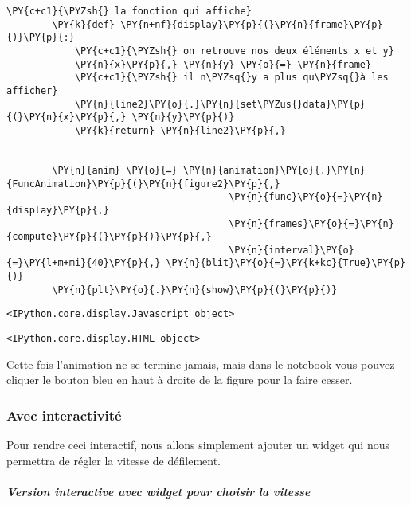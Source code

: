 \begin{Verbatim}[commandchars=\\\{\},frame=single,framerule=0.3mm,rulecolor=\color{cellframecolor}]
        \PY{c+c1}{\PYZsh{} la fonction qui affiche}
        \PY{k}{def} \PY{n+nf}{display}\PY{p}{(}\PY{n}{frame}\PY{p}{)}\PY{p}{:}
            \PY{c+c1}{\PYZsh{} on retrouve nos deux éléments x et y}
            \PY{n}{x}\PY{p}{,} \PY{n}{y} \PY{o}{=} \PY{n}{frame}
            \PY{c+c1}{\PYZsh{} il n\PYZsq{}y a plus qu\PYZsq{}à les afficher}
            \PY{n}{line2}\PY{o}{.}\PY{n}{set\PYZus{}data}\PY{p}{(}\PY{n}{x}\PY{p}{,} \PY{n}{y}\PY{p}{)}
            \PY{k}{return} \PY{n}{line2}\PY{p}{,}
        
        
        \PY{n}{anim} \PY{o}{=} \PY{n}{animation}\PY{o}{.}\PY{n}{FuncAnimation}\PY{p}{(}\PY{n}{figure2}\PY{p}{,}
                                       \PY{n}{func}\PY{o}{=}\PY{n}{display}\PY{p}{,}
                                       \PY{n}{frames}\PY{o}{=}\PY{n}{compute}\PY{p}{(}\PY{p}{)}\PY{p}{,}
                                       \PY{n}{interval}\PY{o}{=}\PY{l+m+mi}{40}\PY{p}{,} \PY{n}{blit}\PY{o}{=}\PY{k+kc}{True}\PY{p}{)}
        \PY{n}{plt}\PY{o}{.}\PY{n}{show}\PY{p}{(}\PY{p}{)}
\end{Verbatim}


    
    \begin{verbatim}
<IPython.core.display.Javascript object>
    \end{verbatim}

    
    
    \begin{verbatim}
<IPython.core.display.HTML object>
    \end{verbatim}

    
    Cette fois l'animation ne se termine jamais, mais dans le notebook vous
pouvez cliquer le bouton bleu en haut à droite de la figure pour la
faire cesser.

    \hypertarget{avec-interactivituxe9}{%
\subsubsection{Avec interactivité}\label{avec-interactivituxe9}}

    Pour rendre ceci interactif, nous allons simplement ajouter un widget
qui nous permettra de régler la vitesse de défilement.

    \hypertarget{version-interactive-avec-widget-pour-choisir-la-vitesse}{%
\subparagraph{Version interactive avec widget pour choisir la
vitesse}\label{version-interactive-avec-widget-pour-choisir-la-vitesse}}

